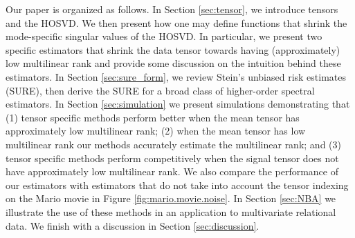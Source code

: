   Our paper is organized as follows. In Section \ref{sec:tensor}, we introduce tensors and the HOSVD. We then present how one may define functions that shrink the mode-specific singular values of the HOSVD. In particular, we present two specific estimators that shrink the data tensor towards having (approximately) low multilinear rank and provide some discussion on the intuition behind these estimators. In Section \ref{sec:sure_form}, we review Stein's unbiased risk estimates (SURE), then derive the SURE for a broad class of higher-order spectral estimators. In Section \ref{sec:simulation} we present simulations demonstrating that (1) tensor specific methods perform better when the mean tensor has approximately low multilinear rank; (2) when the mean tensor has low multilinear rank our methods accurately estimate the multilinear rank; and (3) tensor specific methods perform competitively when the signal tensor does not have approximately low multilinear rank. We also compare the performance of our estimators with estimators that do not take into account the tensor indexing on the Mario movie in Figure \ref{fig:mario.movie.noise}. In Section \ref{sec:NBA} we illustrate the use of these methods in an application to multivariate relational data. We finish with a discussion in Section \ref{sec:discussion}.





